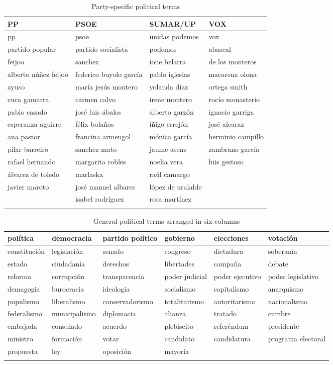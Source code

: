 \documentclass[12pt]{article}
\begin{document}
	\begin{longtable}{|l|l|l|l|}
		\hline
		\textbf{PP} & \textbf{PSOE} & \textbf{SUMAR/UP} & \textbf{VOX} \\
		\hline
		pp & psoe & unidas podemos & vox \\
		partido popular & partido socialista & podemos & abascal \\
		feijoo & sanchez & ione belarra & de los monteros \\
		alberto núñez feijoo & federico buyolo garcía & pablo iglesias & macarena olona \\
		ayuso & maría jesús montero & yolanda díaz & ortega smith \\
		cuca gamarra & carmen calvo & irene montero & rocío monasterio \\
		pablo casado & josé luis ábalos & alberto garzón & ignacio garriga \\
		esperanza aguirre & félix bolaños & íñigo errejón & josé alcaraz \\
		ana pastor & francina armengol & mónica garcía & herminio campillo \\
		pilar barreiro & sanchez mato & jaume asens & zambrano garcía \\
		rafael hernando & margarita robles & noelia vera & luis gestoso \\
		álvarez de toledo & marlaska & raúl camargo &  \\
		javier maroto & josé manuel albares & lópez de uralalde &  \\
		& isabel rodríguez & rosa martínez &  \\
		\hline
		\caption{Party-specific political terms}
		\label{table:party_terms}
	\end{longtable}
	
	
	\begin{longtable}{|l|l|l|l|l|l|}
		\hline
		política & democracia & partido político & gobierno & elecciones & votación \\
		\hline
		constitución & legislación & senado & congreso & dictadura & soberanía \\
		\hline
		estado & ciudadanía & derechos & libertades & campaña & debate \\
		\hline
		reforma & corrupción & transparencia & poder judicial & poder ejecutivo & poder legislativo \\
		\hline
		demagogia & burocracia & ideología & socialismo & capitalismo & anarquismo \\
		\hline
		populismo & liberalismo & conservadorismo & totalitarismo & autoritarismo & nacionalismo \\
		\hline
		federalismo & municipalismo & diplomacia & alianza & tratado & cumbre \\
		\hline
		embajada & consulado & acuerdo & plebiscito & referéndum & presidente \\
		\hline
		ministro & formación & votar & candidato & candidatura & programa electoral \\
		\hline
		propuesta & ley & oposición & mayoría &  &  \\
		\hline
		\caption{General political terms arranged in six columns}
		\label{table:general_political_terms}
	\end{longtable}
	
\end{document}
